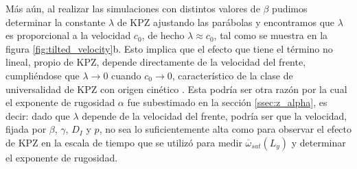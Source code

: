 Más aún, al realizar las simulaciones con distintos valores de $\beta$ pudimos determinar la constante $\lambda$ de KPZ ajustando las parábolas y encontramos que $\lambda$ es proporcional a la velocidad $c_0$, de hecho $\lambda \approx c_0$, tal como se muestra en la figura \ref{fig:tilted_velocity}b. Esto implica que el efecto que tiene el término no lineal, propio de KPZ, depende directamente de la velocidad del frente, cumpliéndose que $\lambda\to0$ cuando $c_0\to0$, característico de la clase de universalidad de KPZ con origen cinético \cite{barabasi}. Esta podría ser otra razón por la cual el exponente de rugosidad $\alpha$ fue subestimado en la sección \ref{ssec:z_alpha}, es decir: dado que $\lambda$ depende de la velocidad del frente, podría ser que la velocidad, fijada por $\beta$, $\gamma$, $D_I$ y $p$, no sea lo suficientemente alta como para observar el efecto de KPZ en la escala de tiempo que se utilizó para medir $\overline{\omega}_{sat}(L_y)$ y determinar el exponente de rugosidad.

